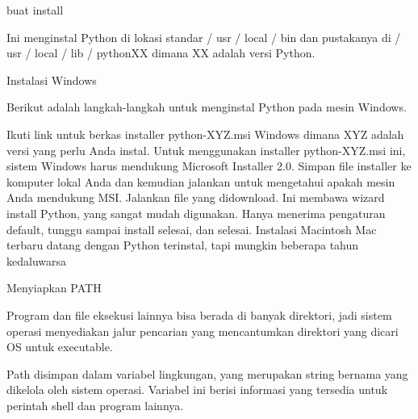 \vspace{14pt}
\noindent 
{\fontsize{14pt}{14pt}\selectfont buat install \\} \par
\vspace{14pt}
\noindent 
{\fontsize{14pt}{14pt}\selectfont Ini menginstal Python di lokasi standar / usr / local / bin dan pustakanya di / usr / local / lib / pythonXX dimana XX adalah versi Python. \\} \par
\vspace{14pt}
\noindent 
{\fontsize{14pt}{14pt}\selectfont Instalasi Windows \\} \par
\noindent 
{\fontsize{14pt}{14pt}\selectfont Berikut adalah langkah-langkah untuk menginstal Python pada mesin Windows. \\} \par
\noindent 
{\fontsize{14pt}{14pt}\selectfont \vspace{\baselineskip}
Ikuti link untuk berkas installer python-XYZ.msi Windows dimana XYZ adalah versi yang perlu Anda instal. Untuk menggunakan installer python-XYZ.msi ini, sistem Windows harus mendukung Microsoft Installer 2.0. Simpan file installer ke komputer lokal Anda dan kemudian jalankan untuk mengetahui apakah mesin Anda mendukung MSI. Jalankan file yang didownload. Ini membawa wizard install Python, yang sangat mudah digunakan. Hanya menerima pengaturan default, tunggu sampai install selesai, dan selesai. Instalasi Macintosh Mac terbaru datang dengan Python terinstal, tapi mungkin beberapa tahun kedaluwarsa \\} \par
\noindent 
{\fontsize{14pt}{14pt}\selectfont Menyiapkan PATH \\} \par
\noindent 
{\fontsize{14pt}{14pt}\selectfont Program dan file eksekusi lainnya bisa berada di banyak direktori, jadi sistem operasi menyediakan jalur pencarian yang mencantumkan direktori yang dicari OS untuk executable. \\} \par
\vspace{14pt}
\noindent 
{\fontsize{14pt}{14pt}\selectfont Path disimpan dalam variabel lingkungan, yang merupakan string bernama yang dikelola oleh sistem operasi. Variabel ini berisi informasi yang tersedia untuk perintah shell dan program lainnya. \\} \par
\vspace{14pt}
